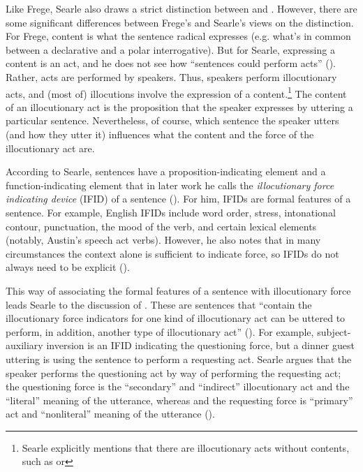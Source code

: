 Like Frege, Searle also draws a strict distinction between  and . However, there are some significant differences between Frege’s and Searle’s views on the distinction. For Frege, content is what the sentence radical expresses (e.g. what’s in common between a declarative and a polar interrogative). But for Searle, expressing a content is an act, and he does not see how ``sentences could perform acts'' (\cite[257]{searle1976class}). Rather, acts are performed by speakers. Thus, speakers perform illocutionary acts, and (most of) illocutions involve the expression of a content.\footnote{Searle explicitly mentions that there are illocutionary acts without contents, such as  or } The content of an illocutionary act is the proposition that the speaker expresses by uttering a particular sentence. Nevertheless, of course, which sentence the speaker utters (and how they utter it) influences what the content and the force of the illocutionary act are. 

According to Searle, sentences have a proposition-indicating element and a function-indicating element that in later work he calls the \emph{illocutionary force indicating device} (IFID) of a sentence (\cite{searle1976class}). For him, IFIDs are formal features of a sentence. For example, English IFIDs include word order, stress, intonational contour, punctuation, the mood of the verb, and certain lexical elements (notably, Austin’s speech act verbs). However, he also notes that in many circumstances the context alone is sufficient to indicate force, so IFIDs do not always need to be explicit (\cite[257]{searle1976class}). 





This way of associating the formal features of a sentence with illocutionary force leads Searle to the discussion of . These are sentences that ``contain the illocutionary force indicators for one kind of illocutionary act can be uttered to perform, in addition, another type of illocutionary act'' (\cite[168]{searle1975indirect}). For example, subject-auxiliary inversion is an IFID indicating the questioning force, but a dinner guest uttering  is using the sentence to perform a requesting act. Searle argues that the speaker performs the questioning act by way of performing the requesting act; the questioning force is the ``secondary'' and ``indirect'' illocutionary act and the ``literal'' meaning of the utterance, whereas and the requesting force is ``primary'' act and ``nonliteral'' meaning of the utterance (\cite[170]{searle1975indirect}). 

